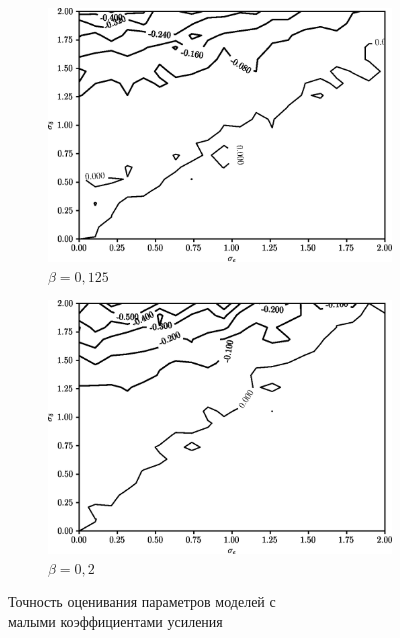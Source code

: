 \begin{figure}[p]
  \begin{subfigure}[b]{\linewidth}
    \centering
    \includegraphics[width=135mm]{fig/linear/param/beta-0,125_param.png}
    \caption{\( \beta = 0{,}125 \)}
  \end{subfigure}

  \vspace{2\baselineskip}
  \begin{subfigure}[b]{\linewidth}
    \centering
    \includegraphics[width=135mm]{fig/linear/param/beta-0,2_param.png}
    \caption{\( \beta = 0{,}2 \)}
  \end{subfigure}

  \vspace{\baselineskip}
  \caption{Точность оценивания параметров моделей с \\ малыми коэффициентами усиления}\label{fig:comparison_linear_params_beta-small}
\end{figure}


